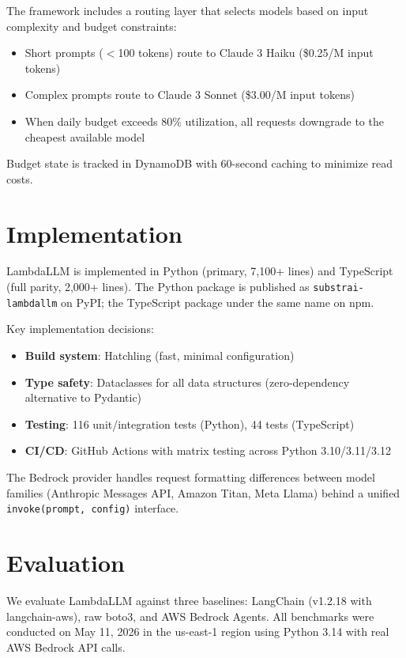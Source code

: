 \documentclass[11pt,a4paper]{article}
\begin{document}
The framework includes a routing layer that selects models based on input complexity and budget constraints:

\begin{itemize}
    \item Short prompts ($<$100 tokens) route to Claude 3 Haiku (\$0.25/M input tokens)
    \item Complex prompts route to Claude 3 Sonnet (\$3.00/M input tokens)
    \item When daily budget exceeds 80\% utilization, all requests downgrade to the cheapest available model
\end{itemize}

Budget state is tracked in DynamoDB with 60-second caching to minimize read costs.

\section{Implementation}

LambdaLLM is implemented in Python (primary, 7,100+ lines) and TypeScript (full parity, 2,000+ lines). The Python package is published as \texttt{substrai-lambdallm} on PyPI; the TypeScript package under the same name on npm.

Key implementation decisions:

\begin{itemize}
    \item \textbf{Build system}: Hatchling (fast, minimal configuration)
    \item \textbf{Type safety}: Dataclasses for all data structures (zero-dependency alternative to Pydantic)
    \item \textbf{Testing}: 116 unit/integration tests (Python), 44 tests (TypeScript)
    \item \textbf{CI/CD}: GitHub Actions with matrix testing across Python 3.10/3.11/3.12
\end{itemize}

The Bedrock provider handles request formatting differences between model families (Anthropic Messages API, Amazon Titan, Meta Llama) behind a unified \texttt{invoke(prompt, config)} interface.

\section{Evaluation}

We evaluate LambdaLLM against three baselines: LangChain (v1.2.18 with langchain-aws), raw boto3, and AWS Bedrock Agents. All benchmarks were conducted on May 11, 2026 in the us-east-1 region using Python 3.14 with real AWS Bedrock API calls.
\end{document}
